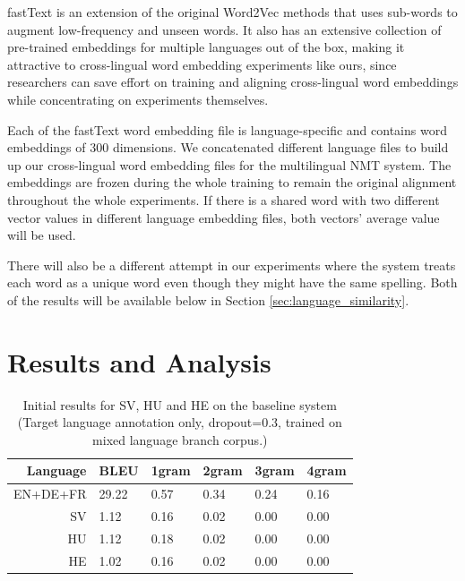 \documentclass[thesis]{cluu}
\begin{document}
fastText is an extension of the original Word2Vec methods that uses sub-words to augment low-frequency and unseen words. It also has an extensive collection of pre-trained embeddings for multiple languages out of the box, making it attractive to cross-lingual word embedding experiments like ours, since researchers can save effort on training and aligning cross-lingual word embeddings while concentrating on experiments themselves.

Each of the fastText word embedding file is language-specific and contains word embeddings of 300 dimensions. We concatenated different language files to build up our cross-lingual word embedding files for the multilingual NMT system. The embeddings are frozen during the whole training to remain the original alignment throughout the whole experiments. If there is a shared word with two different vector values in different language embedding files, both vectors' average value will be used.

There will also be a different attempt in our experiments where the system treats each word as a unique word even though they might have the same spelling. Both of the results will be available below in Section \ref{sec:language_similarity}.


\chapter{Results and Analysis}
\label{chap:results}

\begin{table}
  \centering
  \begin{tabular}{r|*{5}{l}}
    \hline
    \textbf{Language} & \textbf{BLEU} & \textbf{1gram} & \textbf{2gram} & \textbf{3gram} & \textbf{4gram} \\ [0.25ex]
    \hline\hline
    EN+DE+FR & 29.22 & 0.57 & 0.34 & 0.24 & 0.16 \\
    SV & 1.12 & 0.16 & 0.02 & 0.00 & 0.00 \\ 
    HU & 1.12 & 0.18 & 0.02 & 0.00 & 0.00 \\
    HE & 1.02 & 0.16 & 0.02 & 0.00 & 0.00 \\
    \hline
  \end{tabular}
  \caption{Initial results for SV, HU and HE on the baseline system (Target language annotation only, dropout=0.3, trained on mixed language branch corpus.)}
  \label{table:initial_results}
\end{table}
\end{document}
